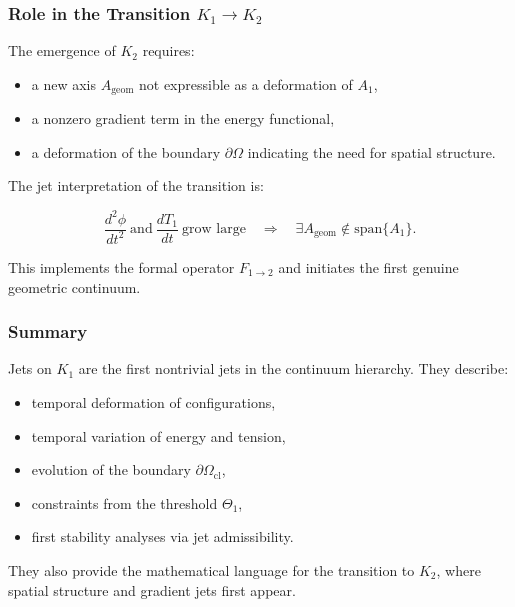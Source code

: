 \subsubsection{Role in the Transition \texorpdfstring{\texorpdfstring{$K_1\to K_2$}{K_1\to K_2}}{K1→K2}}

The emergence of $K_2$ requires:

\begin{itemize}
    \item a new axis $A_{\mathrm{geom}}$ not expressible as a
    deformation of $A_1$,
    \item a nonzero gradient term in the energy functional,
    \item a deformation of the boundary $\partial\Omega$ indicating the
    need for spatial structure.
\end{itemize}

The jet interpretation of the transition is:

\[
\frac{d^2\phi}{dt^2} \ \text{and}\ 
\frac{dT_1}{dt}\ \text{grow large}
\quad\Longrightarrow\quad
\exists A_{\mathrm{geom}}\notin \text{span}\{A_1\}.
\]

This implements the formal operator $F_{1\to2}$ and initiates the first
genuine geometric continuum.



\subsubsection{Summary}

Jets on $K_1$ are the first nontrivial jets in the continuum hierarchy.
They describe:

\begin{itemize}
    \item temporal deformation of configurations,
    \item temporal variation of energy and tension,
    \item evolution of the boundary $\partial\Omega_{\mathrm{cl}}$,
    \item constraints from the threshold $\Theta_1$,
    \item first stability analyses via jet admissibility.
\end{itemize}

They also provide the mathematical language for the transition to $K_2$,
where spatial structure and gradient jets first appear.
